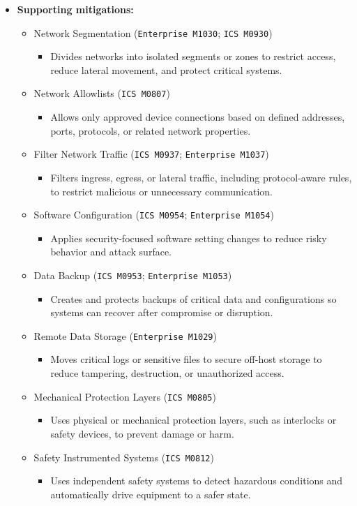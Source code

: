 \documentclass[10pt,a4paper,oneside]{report}
\begin{document}
\begin{itemize}
\item \textbf{Supporting mitigations:}
\begin{itemize}
\item Network Segmentation (\texttt{Enterprise M1030}; \texttt{ICS M0930})
\begin{itemize}
\item Divides networks into isolated segments or zones to restrict access, reduce lateral movement, and protect critical systems.
\end{itemize}
\item Network Allowlists (\texttt{ICS M0807})
\begin{itemize}
\item Allows only approved device connections based on defined addresses, ports, protocols, or related network properties.
\end{itemize}
\item Filter Network Traffic (\texttt{ICS M0937}; \texttt{Enterprise M1037})
\begin{itemize}
\item Filters ingress, egress, or lateral traffic, including protocol-aware rules, to restrict malicious or unnecessary communication.
\end{itemize}
\item Software Configuration (\texttt{ICS M0954}; \texttt{Enterprise M1054})
\begin{itemize}
\item Applies security-focused software setting changes to reduce risky behavior and attack surface.
\end{itemize}
\item Data Backup (\texttt{ICS M0953}; \texttt{Enterprise M1053})
\begin{itemize}
\item Creates and protects backups of critical data and configurations so systems can recover after compromise or disruption.
\end{itemize}
\item Remote Data Storage (\texttt{Enterprise M1029})
\begin{itemize}
\item Moves critical logs or sensitive files to secure off-host storage to reduce tampering, destruction, or unauthorized access.
\end{itemize}
\item Mechanical Protection Layers (\texttt{ICS M0805})
\begin{itemize}
\item Uses physical or mechanical protection layers, such as interlocks or safety devices, to prevent damage or harm.
\end{itemize}
\item Safety Instrumented Systems (\texttt{ICS M0812})
\begin{itemize}
\item Uses independent safety systems to detect hazardous conditions and automatically drive equipment to a safer state.
\end{itemize}
\end{itemize}
\end{itemize}
\end{document}
